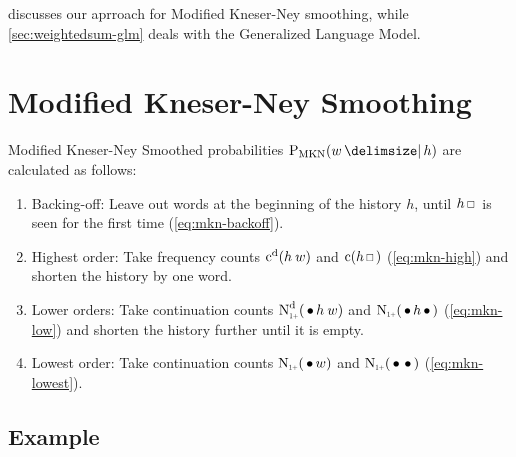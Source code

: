  discusses our aprroach for Modified Kneser-Ney
smoothing, while \cref{sec:weightedsum-glm} deals with the Generalized
Language Model.


\clearpage
\section{Modified Kneser-Ney Smoothing}
\label{sec:weightedsum-mkn}

Modified Kneser-Ney Smoothed probabilities $\ProbMKN{w}{h}$ are calculated as
follows:
\begin{enumerate}
  \item Backing-off: Leave out words at the beginning of the history $h$, until
    $h \Skp$ is seen for the first time (\cref{eq:mkn-backoff}).
  \item Highest order: Take frequency counts $\DiscountedCount(h \: w)$ and
    $\Count(h \Skp)$ (\cref{eq:mkn-high}) and shorten the history by one word.
  \item Lower orders: Take continuation counts $\DiscountedCount*(\WSkp h \: w)$
    and $\ContCountIp(\WSkp h \WSkp)$ (\cref{eq:mkn-low}) and shorten the
    history further until it is empty.
  \item Lowest order: Take continuation counts $\ContCountIp(\WSkp w)$ and
    $\ContCountIp(\WSkp \WSkp)$ (\cref{eq:mkn-lowest}).
\end{enumerate}

\newcommand{\ProbMKNcab}[1]
  {\frac{\DiscountedCount(w_1 w_2 w_3) + \gamma(w_1 w_2) #1}{\Count(w_1 w_2 \Skp)}}
\newcommand{\ProbMKNcb}[1]
  {\frac{\DiscountedCount*(\WSkp w_2 w_3) + \gamma(w_2) #1}{\ContCountIp(\WSkp w_2 \WSkp)}}
\newcommand{\ProbMKNc}
  {\frac{\ContCountIp(\WSkp w_3)}{\ContCountIp(\text{\WSkp \WSkp})}}

\subsection{Example}

